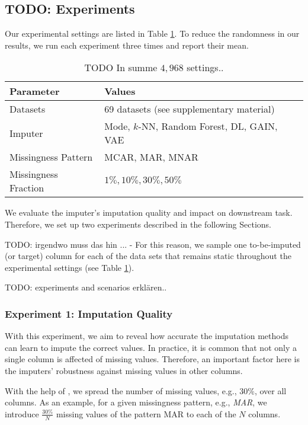 \subsection{TODO: Experiments}
%
Our experimental settings are listed in Table \ref{tab:experiment_settings}. To reduce the randomness in our results, we run each experiment three times and report their mean.
%
\begin{table}[h!]
	\centering
	\begin{tabular}{ll}
		\toprule
		Parameter            & Values                                     \\ \midrule
		Datasets             & 69 datasets (see supplementary material)    \\
		Imputer              & Mode, $k$-NN, Random Forest, DL, GAIN, VAE \\
		Missingness Pattern  & MCAR, MAR, MNAR                            \\
		Missingness Fraction & $1\%, 10\%, 30\%, 50\%$                      \\ \bottomrule
	\end{tabular}
	\caption{TODO In summe $4,968$ settings..}
	\label{tab:experiment_settings}
\end{table}

We evaluate the imputer's imputation quality and impact on downstream task. Therefore, we set up two experiments described in the following Sections.

TODO: irgendwo muss das hin ... - For this reason, we sample one to-be-imputed (or target) column for each of the data sets that remains static throughout the experimental settings (see Table \ref{tab:experiment_settings}).

TODO: experiments and scenarios erklären..

\subsubsection{Experiment 1: Imputation Quality}
\label{sec:experiment_1}
%
With this experiment, we aim to reveal how accurate the imputation methods can learn to impute the correct values. In practice, it is common that not only a single column is affected of missing values. Therefore, an important factor here is the imputers' robustness against missing values in other columns.

With the help of , we spread the number of missing values, e.g., $30\%$, over all columns. As an example, for a given missingness pattern, e.g., \emph{MAR}, we introduce $\frac{30\%}{N}$ missing values of the pattern MAR to each of the $N$ columns.

